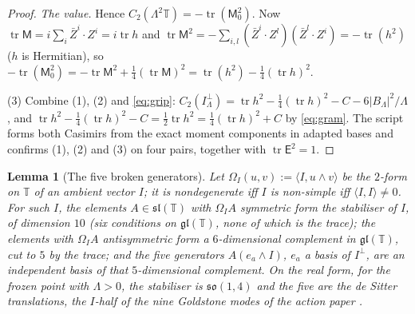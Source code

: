 \documentclass[11pt]{article}
\newtheorem{lemma}[theorem]{Lemma}
\theoremstyle{definition}
\newcommand{\T}{\mathbb{T}}
\newcommand{\tr}{\operatorname{tr}}
\newcommand{\ip}[2]{\langle #1, #2\rangle}
\begin{document}
\begin{proof}
\emph{The value.} Hence $C_{2}(\Lambda^{2}\T) = -\tr(\mathsf{M}_{0}^{2})$. Now $\tr\mathsf{M} = i\sum_{i}\bar{Z}^{i}\cdot Z^{i} = i\tr h$ and $\tr\mathsf{M}^{2} = -\sum_{i,l}(\bar{Z}^{i}\cdot Z^{l})(\bar{Z}^{l}\cdot Z^{i}) = -\tr(h^{2})$ ($h$ is Hermitian), so $-\tr(\mathsf{M}_{0}^{2}) = -\tr\mathsf{M}^{2} + \tfrac14(\tr\mathsf{M})^{2} = \tr(h^{2}) - \tfrac14(\tr h)^{2}$.

(3) Combine (1), (2) and \eqref{eq:grip}: $C_{2}(I_{\Lambda}^{\perp}) = \tr h^{2} - \tfrac14(\tr h)^{2} - C - 6|B_{\Lambda}|^{2}/\Lambda$, and $\tr h^{2} - \tfrac14(\tr h)^{2} - C = \tfrac12\tr h^{2} = \tfrac14(\tr h)^{2} + C$ by \eqref{eq:gram}. The script forms both Casimirs from the exact moment components in adapted bases and confirms (1), (2) and (3) on four pairs, together with $\tr\mathsf{E}^{2} = 1$.
\end{proof}

\begin{lemma}[The five broken generators]\label{lem:five}
Let $\Omega_{I}(u,v) := \ip{I}{u\wedge v}$ be the $2$-form on $\T$ of an ambient vector $I$; it is nondegenerate iff $I$ is non-simple iff $\ip{I}{I} \neq 0$. For such $I$, the elements $A \in \mathfrak{sl}(\T)$ with $\Omega_{I}A$ symmetric form the stabiliser of $I$, of dimension $10$ (six conditions on $\mathfrak{gl}(\T)$, none of which is the trace); the elements with $\Omega_{I}A$ antisymmetric form a $6$-dimensional complement in $\mathfrak{gl}(\T)$, cut to $5$ by the trace; and the five generators $A(e_{a}\wedge I)$, $e_{a}$ a basis of $I^{\perp}$, are an independent basis of that $5$-dimensional complement. On the real form, for the frozen point with $\Lambda > 0$, the stabiliser is $\mathfrak{so}(1,4)$ and the five are the de Sitter translations, the $I$-half of the nine Goldstone modes of the action paper \cite[Prop.~5.4]{ButlerT10}.
\end{lemma}
\end{document}
